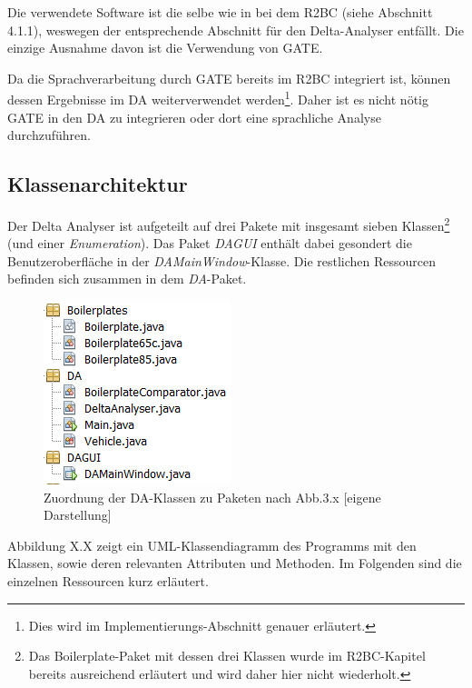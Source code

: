 \documentclass[12pt]{report}
\begin{document}
Die verwendete Software ist die selbe wie in bei dem R2BC (siehe Abschnitt 4.1.1), weswegen der entsprechende Abschnitt für den Delta-Analyser entfällt. Die einzige Ausnahme davon ist die Verwendung von GATE. 

Da die Sprachverarbeitung durch GATE bereits im R2BC integriert ist, können dessen Ergebnisse im DA weiterverwendet werden\footnote{Dies wird im Implementierungs-Abschnitt genauer erläutert.}. Daher ist es nicht nötig GATE in den DA zu integrieren oder dort eine sprachliche Analyse durchzuführen.

\subsection{Klassenarchitektur}
Der Delta Analyser ist aufgeteilt auf drei Pakete mit insgesamt sieben Klassen\footnote{Das Boilerplate-Paket mit dessen drei Klassen wurde im R2BC-Kapitel bereits ausreichend erläutert und wird daher hier nicht wiederholt.} (und einer \textit{Enumeration}). Das Paket \textit{DAGUI} enthält dabei gesondert die Benutzeroberfläche in der \textit{DAMainWindow}-Klasse. Die restlichen Ressourcen befinden sich zusammen in dem \textit{DA}-Paket.

\begin{figure}[h!]
\begin{center}
\includegraphics[scale=1.0]{Bilder/DA-Pakete.png}
\caption{Zuordnung der DA-Klassen zu Paketen nach Abb.3.x [eigene Darstellung]}
\end{center}
\end{figure}

Abbildung X.X zeigt ein UML-Klassendiagramm des Programms mit den Klassen, sowie deren relevanten Attributen und Methoden. Im Folgenden sind die einzelnen Ressourcen kurz erläutert.
\end{document}
